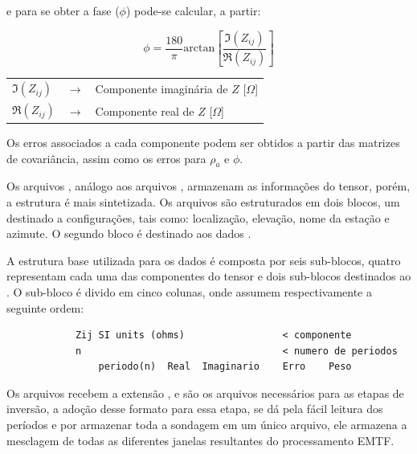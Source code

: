         \noindent e para se obter a fase ($\phi$) pode-se calcular, a partir:
        
        \begin{equation}
         \phi = \dfrac{180}{\pi} \textrm{arctan}\left [\dfrac{\Im(Z_{ij})}{\Re(Z_{ij})} \right ]
        \end{equation}

        {\footnotesize \noindent
            \begin{table}[H]
                \begin{tabular*}{5cm}{p{.9cm}p{0.1cm}p{10cm}}
                    {\footnotesize $\Im(Z_{ij})$}  & {\footnotesize $\rightarrow$} & {\footnotesize Componente imaginária de $Z$ [$\Omega$]}\\
                    {\footnotesize $\Re(Z_{ij})$}  & {\footnotesize $\rightarrow$} & {\footnotesize Componente real de  $Z$ [$\Omega$]}\\
                \end{tabular*}
            \end{table}}
        
        Os erros associados a cada componente podem ser obtidos a partir das matrizes de covariância, assim como os erros para $\rho_a$ e $\phi$.
        
        Os arquivos , análogo aos arquivos , armazenam as informações do tensor, porém, a estrutura é mais sintetizada. Os arquivos são estruturados em dois blocos, um destinado a configurações, tais como: localização, elevação, nome da estação e azimute. O segundo bloco é destinado aos dados \cite{j-format}.
        
        A estrutura base utilizada para os dados é composta por seis sub-blocos, quatro representam cada uma das componentes do tensor e dois sub-blocos destinados ao   . O sub-bloco é divido em cinco colunas, onde assumem respectivamente a seguinte ordem: 
        
\begin{footnotesize}        
\begin{verbatim}
            Zij SI units (ohms)                 < componente
            n                                   < numero de periodos
                periodo(n)  Real  Imaginario    Erro    Peso
\end{verbatim}
\end{footnotesize}
               
        Os arquivos  recebem a extensão , e são os arquivos necessários para as etapas de inversão, a adoção desse formato para essa etapa, se dá pela fácil leitura dos períodos e por armazenar toda a sondagem em um único arquivo, ele armazena a mesclagem de todas as diferentes janelas resultantes do processamento EMTF.
        
